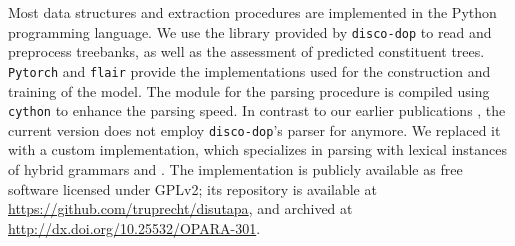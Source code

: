 \documentclass[../../document.tex]{subfiles}
\begin{document}
    Most data structures and extraction procedures are implemented in the Python programming language.
    We use the library provided by \texttt{disco-dop} \citep{Cra12} to read and preprocess treebanks, as well as the assessment of predicted constituent trees.
    \texttt{Pytorch} \citep{paszke2019pytorch} and \texttt{flair} \citep{Akb19} provide the implementations used for the construction and training of the  model.
    The module for the parsing procedure is compiled using \texttt{cython} \citep{behnel2011cython} to enhance the parsing speed.
    In contrast to our earlier publications \citep{RupMoe21,Rup22}, the current version does not employ \texttt{disco-dop}'s parser for  anymore.
    We replaced it with a custom implementation, which specializes in parsing with lexical instances of hybrid grammars and .
    The implementation is publicly available as free software licensed under GPLv2; its repository is available at \url{https://github.com/truprecht/disutapa}, and archived at \url{http://dx.doi.org/10.25532/OPARA-301}.
\end{document}
